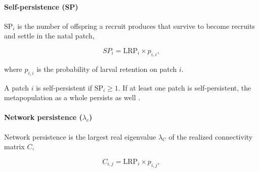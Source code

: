 \documentclass[12pt, oneside]{article}   	%
\begin{document}
\paragraph*{Self-persistence (SP)} 

$\text{SP}_i$ is the number of offspring a recruit produces that survive to become recruits and settle in the natal patch,

\begin{equation}
SP_i = \text{LRP}_i \times p_{i,i}, \label{EQN_SP}  %
\end{equation}

where $p_{i,i}$ is the probability of larval retention on patch $i$.

A patch $i$ is self-persistent if $\text{SP}_i \geq 1$. If at least one patch is self-persistent, the metapopulation as a whole persists as well \citep{hastings_persistence_2006, burgess2014beyond}. 


\paragraph*{Network persistence ($\lambda_c$)}

Network persistence is the largest real eigenvalue $\lambda_C$ of the realized connectivity matrix $C$,

\begin{equation}
C_{i,j} = \text{LRP}_i \times p_{i,j}, \label{EQN_Connectivity_matrix}
\end{equation} 
\end{document}
